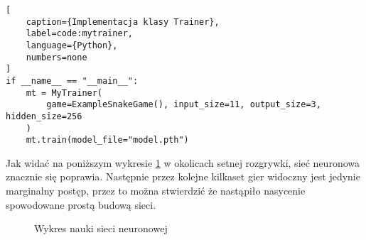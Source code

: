 \begin{onepage}
    \begin{lstlisting}[
    caption={Implementacja klasy Trainer},
    label=code:mytrainer,
    language={Python},
    numbers=none
]
if __name__ == "__main__":
    mt = MyTrainer(
        game=ExampleSnakeGame(), input_size=11, output_size=3, hidden_size=256
    )
    mt.train(model_file="model.pth")
\end{lstlisting}
\end{onepage}

Jak widać na poniższym wykresie \ref{img:ai_graph} w okolicach setnej rozgrywki, sieć neuronowa znacznie się poprawia. Następnie przez kolejne kilkaset gier widoczny jest jedynie marginalny postęp, przez to można stwierdzić że nastąpiło nasycenie spowodowane prostą budową sieci.

\begin{figure}[h]
    \centering
    \caption{Wykres nauki sieci neuronowej}
    \label{img:ai_graph}
\end{figure}
